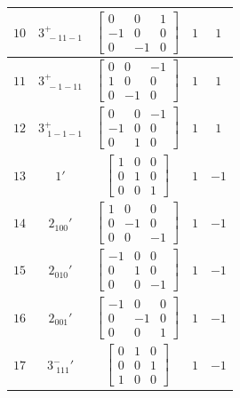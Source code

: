 \documentclass[fleqn,8pt]{jsarticle}
\begin{document}
\begin{longtable}{ccccc}
$ 10 $ & $ 3^{+}_{\,\,-11-1} $ & $ \begin{bmatrix} 0 & 0 & 1 \\ -1 & 0 & 0 \\ 0 & -1 & 0 \end{bmatrix} $ & $ 1 $ & $ 1 $ \\ \hline
$ 11 $ & $ 3^{+}_{\,\,-1-11} $ & $ \begin{bmatrix} 0 & 0 & -1 \\ 1 & 0 & 0 \\ 0 & -1 & 0 \end{bmatrix} $ & $ 1 $ & $ 1 $ \\ \hline
$ 12 $ & $ 3^{+}_{\,\,1-1-1} $ & $ \begin{bmatrix} 0 & 0 & -1 \\ -1 & 0 & 0 \\ 0 & 1 & 0 \end{bmatrix} $ & $ 1 $ & $ 1 $ \\ \hline
$ 13 $ & $ 1{}' $ & $ \begin{bmatrix} 1 & 0 & 0 \\ 0 & 1 & 0 \\ 0 & 0 & 1 \end{bmatrix} $ & $ 1 $ & $ -1 $ \\ \hline
$ 14 $ & $ 2{}_{100}{}' $ & $ \begin{bmatrix} 1 & 0 & 0 \\ 0 & -1 & 0 \\ 0 & 0 & -1 \end{bmatrix} $ & $ 1 $ & $ -1 $ \\ \hline
$ 15 $ & $ 2{}_{010}{}' $ & $ \begin{bmatrix} -1 & 0 & 0 \\ 0 & 1 & 0 \\ 0 & 0 & -1 \end{bmatrix} $ & $ 1 $ & $ -1 $ \\ \hline
$ 16 $ & $ 2{}_{001}{}' $ & $ \begin{bmatrix} -1 & 0 & 0 \\ 0 & -1 & 0 \\ 0 & 0 & 1 \end{bmatrix} $ & $ 1 $ & $ -1 $ \\ \hline
$ 17 $ & $ 3^{-}_{\,\,111}{}' $ & $ \begin{bmatrix} 0 & 1 & 0 \\ 0 & 0 & 1 \\ 1 & 0 & 0 \end{bmatrix} $ & $ 1 $ & $ -1 $ \\ \hline

\end{longtable}
\end{document}
